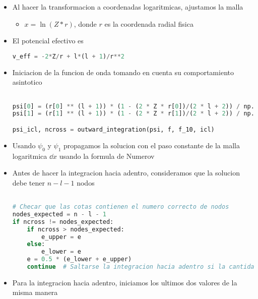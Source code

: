 \documentclass[11pt]{article}
\begin{document}
\begin{itemize}
\item Al hacer la transformacion a coordenadas logaritmicas, ajustamos la malla

\begin{itemize}
\item \(x = \ln(Z*r)\), donde \(r\) es la coordenada radial fisica
\end{itemize}

\item El potencial efectivo es

\begin{lstlisting}[language=Python,numbers=none]
v_eff = -2*Z/r + l*(l + 1)/r**2
\end{lstlisting}

\item Iniciacion de la funcion de onda tomando en cuenta su comportamiento asintotico

\begin{lstlisting}[language=Python,numbers=none]

psi[0] = (r[0] ** (l + 1)) * (1 - (2 * Z * r[0])/(2 * l + 2)) / np.sqrt(r[0])
psi[1] = (r[1] ** (l + 1)) * (1 - (2 * Z * r[1])/(2 * l + 2)) / np.sqrt(r[1])

psi_icl, ncross = outward_integration(psi, f, f_10, icl)

\end{lstlisting}

\item Usando \(\psi_0\) y \(\psi_1\) propagamos la solucion con el paso constante de la malla logaritmica \(\dd{x}\) usando la formula de Numerov

\item Antes de hacer la integracion hacia adentro, consideramos que la solucion debe tener \(n - l - 1\) nodos

\begin{lstlisting}[language=Python,numbers=none]

# Checar que las cotas contienen el numero correcto de nodos
nodes_expected = n - l - 1
if ncross != nodes_expected:
    if ncross > nodes_expected:
        e_upper = e
    else:
        e_lower = e
    e = 0.5 * (e_lower + e_upper)
    continue  # Saltarse la integracion hacia adentro si la cantidad de nodos es incorrecta

\end{lstlisting}

\item Para la integracion hacia adentro, iniciamos los ultimos dos valores de la misma manera


\end{itemize}
\end{document}
